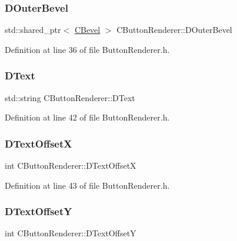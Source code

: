 \subsubsection{\texorpdfstring{D\+Outer\+Bevel}{DOuterBevel}}
{\footnotesize\ttfamily std\+::shared\+\_\+ptr$<$ \hyperlink{classCBevel}{C\+Bevel} $>$ C\+Button\+Renderer\+::\+D\+Outer\+Bevel\hspace{0.3cm}{\ttfamily [protected]}}



Definition at line 36 of file Button\+Renderer.\+h.

\hypertarget{classCButtonRenderer_a8f058166dec8d1c73adc009e4c436092}{}\label{classCButtonRenderer_a8f058166dec8d1c73adc009e4c436092} 
\subsubsection{\texorpdfstring{D\+Text}{DText}}
{\footnotesize\ttfamily std\+::string C\+Button\+Renderer\+::\+D\+Text\hspace{0.3cm}{\ttfamily [protected]}}



Definition at line 42 of file Button\+Renderer.\+h.

\hypertarget{classCButtonRenderer_aaeb649ff53e0032e756c53b2f51f3d96}{}\label{classCButtonRenderer_aaeb649ff53e0032e756c53b2f51f3d96} 
\subsubsection{\texorpdfstring{D\+Text\+OffsetX}{DTextOffsetX}}
{\footnotesize\ttfamily int C\+Button\+Renderer\+::\+D\+Text\+OffsetX\hspace{0.3cm}{\ttfamily [protected]}}



Definition at line 43 of file Button\+Renderer.\+h.

\hypertarget{classCButtonRenderer_a3922fa80775b693fd83e4d5e9f518b23}{}\label{classCButtonRenderer_a3922fa80775b693fd83e4d5e9f518b23} 
\subsubsection{\texorpdfstring{D\+Text\+OffsetY}{DTextOffsetY}}
{\footnotesize\ttfamily int C\+Button\+Renderer\+::\+D\+Text\+OffsetY\hspace{0.3cm}{\ttfamily [protected]}}



